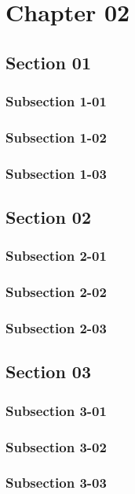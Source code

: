 \chapter{Chapter 02}

\bt

\section{Section 01}
\bt
\subsection{Subsection 1-01}
\bt
\subsection{Subsection 1-02}
\bt
\subsection{Subsection 1-03}
\bt

\section{Section 02}
\bt
\subsection{Subsection 2-01}
\bt
\subsection{Subsection 2-02}
\bt
\subsection{Subsection 2-03}
\bt

\section{Section 03}
\bt
\subsection{Subsection 3-01}
\bt
\subsection{Subsection 3-02}
\bt
\subsection{Subsection 3-03}
\bt
